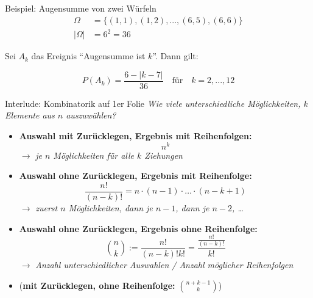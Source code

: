 \documentclass[
  10pt,
  ignorenonframetext,
]{beamer}
\begin{document}
\begin{frame}{Beispiel: Augensumme von zwei Würfeln}
\label{beispiel-augensumme-von-zwei-wuxfcrfeln}
\begin{align*}
\Omega &= \{(1, 1), (1, 2), ..., (6, 5), (6,6)\} \\
|\Omega| &= 6^2 =  36
\end{align*}

Sei \(A_k\) das Ereignis ``Augensumme ist \(k\)''. Dann gilt:

\[P(A_k) = \frac{6 - |k - 7|}{36}\quad\mbox{für}\quad k=2,...,12\]

\end{frame}

\begin{frame}{Interlude: Kombinatorik auf 1er Folie}
\label{interlude-kombinatorik-auf-1er-folie}
\emph{Wie viele unterschiedliche Möglichkeiten, \(k\) Elemente aus \(n\)
auszuwählen?}

\begin{itemize}
\item \textbf{Auswahl mit Zurücklegen, Ergebnis mit Reihenfolgen:} $$n^k$$  
   $\to$ \emph{je $n$ Möglichkeiten für alle $k$ Ziehungen}
\item \textbf{Auswahl ohne Zurücklegen, Ergebnis mit Reihenfolge:}
        $$\frac{n!}{(n-k)!} = n \cdot (n-1) \cdot \ldots \cdot (n-k+1)$$
   $\to$ \emph{zuerst $n$ Möglichkeiten, dann je $n-1$, dann je $n-2$, \dots}
\item \textbf{Auswahl ohne Zurücklegen, Ergebnis ohne Reihenfolge:}
     $$\binom{n}{k} := \frac{n!}{(n-k)!k!} = \frac{\frac{n!}{(n-k)!}}{k!}$$
   $\to$ \emph{Anzahl unterschiedlicher Auswahlen / Anzahl möglicher Reihenfolgen}
\item (\textbf{mit Zurücklegen, ohne Reihenfolge:} $\binom{n+k-1}{k}$) 
\end{itemize}
\end{frame}
\end{document}
